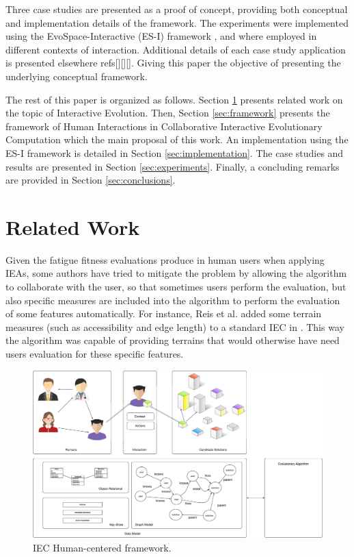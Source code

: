 Three case studies are presented as a proof of concept, providing both
conceptual and implementation details of the framework. 
The experiments were implemented using the EvoSpace-Interactive (ES-I) framework \cite{garcia2013evospace}, 
and where employed in different contexts of interaction. 
Additional details of each case study application is presented elsewhere refs[][][]. 
Giving this paper the objective of presenting the underlying conceptual framework.     

The rest of this paper is organized as follows.
Section \ref{sec:related} presents related work on the topic 
of Interactive Evolution.
Then, Section \ref{sec:framework} presents the framework of Human Interactions in Collaborative Interactive 
 Evolutionary Computation which 
the main proposal of this work. An implementation using the ES-I framework is detailed in Section \ref{sec:implementation}.
The case studies  and results are presented in Section \ref{sec:experiments}.
Finally, a concluding remarks are provided in Section \ref{sec:conclusions}.

\section{Related Work}
\label{sec:related}
Given the fatigue fitness evaluations produce in human users when applying IEAs, some authors have tried to mitigate the problem by allowing the algorithm to collaborate with the user, so that sometimes users perform the evaluation, but also specific measures are included into the algorithm to perform the evaluation of some features automatically.  For instance, Reis et al. added some terrain measures (such as accessibility and edge length) to a standard IEC in \cite{DBLP:journals/soco/FradeVC12} .  This way the algorithm was capable of providing terrains that would otherwise have need users evaluation for these specific features.


\begin{figure}[!t]
    \centering
        \includegraphics[width=4.5in]{img/framework.eps}
    \caption{IEC Human-centered framework.}
    \label{fig:hc_framework}
\end{figure}

